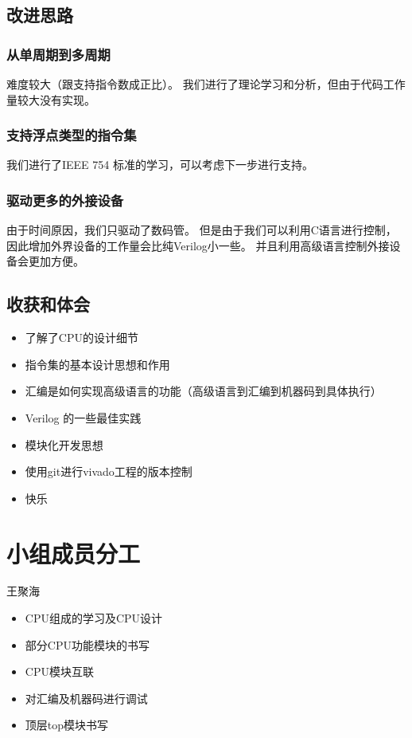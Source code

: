 \documentclass[UTF8]{article}
\begin{document}
\subsection{改进思路}
\subsubsection{从单周期到多周期}
  
难度较大（跟支持指令数成正比）。
我们进行了理论学习和分析，但由于代码工作量较大没有实现。
  
\subsubsection{支持浮点类型的指令集}
我们进行了IEEE 754 标准的学习，可以考虑下一步进行支持。
  
\subsubsection{驱动更多的外接设备}
由于时间原因，我们只驱动了数码管。
但是由于我们可以利用C语言进行控制，
因此增加外界设备的工作量会比纯Verilog小一些。
并且利用高级语言控制外接设备会更加方便。

\subsection{收获和体会}

\begin{itemize}
\item 了解了CPU的设计细节
\item 指令集的基本设计思想和作用
\item 汇编是如何实现高级语言的功能（高级语言到汇编到机器码到具体执行）
\item Verilog 的一些最佳实践
\item 模块化开发思想
\item 使用git进行vivado工程的版本控制
\item 快乐
\end{itemize}


\section{小组成员分工}
王聚海

\begin{itemize}
\item CPU组成的学习及CPU设计
\item 部分CPU功能模块的书写
\item CPU模块互联
\item 对汇编及机器码进行调试
\item 顶层top模块书写
\end{itemize}
\end{document}
